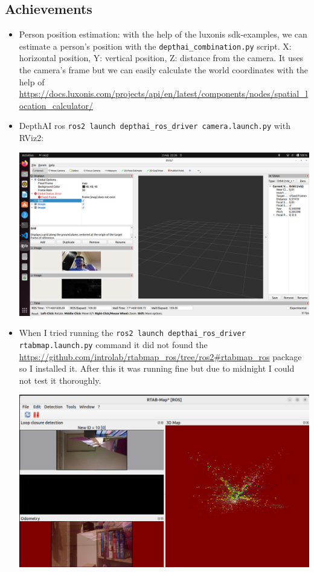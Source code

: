 \documentclass{article}
\begin{document}
\subsection{Achievements}
\begin{itemize}
    \item Person position estimation: with the help of the luxonis sdk-examples, we can estimate a person's position with the \verb|depthai_combination.py| script. X: horizontal position, Y: vertical position, Z: distance from the camera. It uses the camera's frame but we can easily calculate the world coordinates with the help of \url{https://docs.luxonis.com/projects/api/en/latest/components/nodes/spatial_location_calculator/}
    \item DepthAI ros \verb|ros2 launch depthai_ros_driver camera.launch.py| with RViz2:\par
    \begin{minipage}{\linewidth}
        \centering
        \includegraphics[width=1\linewidth]{images/depthai_ros_camera.png}
    \end{minipage}
    \item When I tried running the \verb|ros2 launch depthai_ros_driver rtabmap.launch.py| command it did not found the \url{https://github.com/introlab/rtabmap_ros/tree/ros2#rtabmap_ros} package so I installed it. After this it was running fine but due to midnight I could not test it thoroughly.\par
    \begin{minipage}{\linewidth}
        \centering
        \includegraphics[width=1\linewidth]{images/rtabmap_ros.png}
    \end{minipage}
    
\end{itemize}
\end{document}
